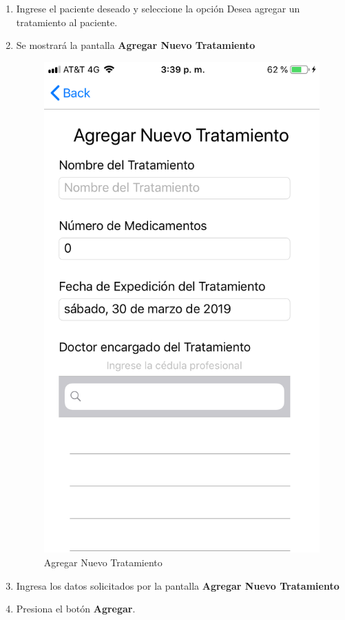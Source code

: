 \begin{enumerate}
	
	\item Ingrese el paciente deseado y seleccione la opción Desea agregar un tratamiento al paciente.
	
	\item Se mostrará la pantalla \textbf{Agregar Nuevo Tratamiento}
	\newpage
	\begin{figure}[!htbp]			
		\hypertarget{fig:AgregarTratamiento}{\hspace{1pt}}
		\begin{center}
			\includegraphics[height=0.4\textheight]{Paciente/AgregarTratamiento/images/AgregarTratamiento}
			\caption{Agregar Nuevo Tratamiento}
			\label{fig:AgregarTratamiento}
		\end{center}
	\end{figure}
	
	\item Ingresa los datos solicitados por la pantalla \textbf{Agregar Nuevo Tratamiento}
	
	\item Presiona el botón \textbf{Agregar}.
	
\end{enumerate}


